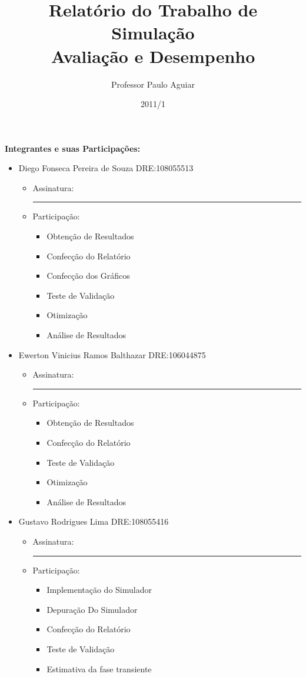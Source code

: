 \documentclass[a4paper,10pt]{article}
\title{\textbf{Relatório do Trabalho de Simulação} \\ Avaliação e Desempenho}
\author{Professor Paulo Aguiar}
\date{2011/1}
\begin{document}
\maketitle
\pagestyle{plain}
\textbf{Integrantes e suas Participações:}
\begin{itemize}
 \item Diego Fonseca Pereira de Souza   DRE:108055513
 \begin{itemize}
    \item Assinatura: \rule{6cm}{.1mm}	
    \item Participação:
    \begin{itemize}
	\item Obtenção de Resultados
	\item Confecção do Relatório
	\item Confecção dos Gráficos
	\item Teste de Validação
	\item Otimização
	\item Análise de Resultados
    \end{itemize}
 \end{itemize}
 \item Ewerton Vinicius Ramos Balthazar DRE:106044875
  \begin{itemize}
    \item Assinatura: \rule{6cm}{.1mm}	
    \item Participação:
    \begin{itemize}
	\item Obtenção de Resultados
	\item Confecção do Relatório
	\item Teste de Validação
	\item Otimização
	\item Análise de Resultados
    \end{itemize}
 \end{itemize}
 \item Gustavo Rodrigues Lima           DRE:108055416
  \begin{itemize}
    \item Assinatura: \rule{6cm}{.1mm}	
    \item Participação:
    \begin{itemize}
	\item Implementação do Simulador
	\item Depuração Do Simulador
	\item Confecção do Relatório
	\item Teste de Validação
	\item Estimativa da fase transiente

\end{itemize}
\end{itemize}
\end{itemize}
\end{document}
